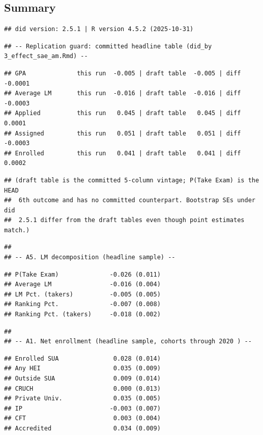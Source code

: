 \documentclass[
]{article}
\begin{document}
\hypertarget{summary}{%
\subsection{Summary}\label{summary}}

\begin{verbatim}
## did version: 2.5.1 | R version 4.5.2 (2025-10-31)
\end{verbatim}

\begin{verbatim}
## -- Replication guard: committed headline table (did_by 3_effect_sae_am.Rmd) --
\end{verbatim}

\begin{verbatim}
## GPA              this run  -0.005 | draft table  -0.005 | diff  -0.0001
## Average LM       this run  -0.016 | draft table  -0.016 | diff  -0.0003
## Applied          this run   0.045 | draft table   0.045 | diff   0.0001
## Assigned         this run   0.051 | draft table   0.051 | diff  -0.0003
## Enrolled         this run   0.041 | draft table   0.041 | diff   0.0002
\end{verbatim}

\begin{verbatim}
## (draft table is the committed 5-column vintage; P(Take Exam) is the HEAD
##  6th outcome and has no committed counterpart. Bootstrap SEs under did
##  2.5.1 differ from the draft tables even though point estimates match.)
\end{verbatim}

\begin{verbatim}
## 
## -- A5. LM decomposition (headline sample) --
\end{verbatim}

\begin{verbatim}
## P(Take Exam)              -0.026 (0.011)
## Average LM                -0.016 (0.004)
## LM Pct. (takers)          -0.005 (0.005)
## Ranking Pct.              -0.007 (0.008)
## Ranking Pct. (takers)     -0.018 (0.002)
\end{verbatim}

\begin{verbatim}
## 
## -- A1. Net enrollment (headline sample, cohorts through 2020 ) --
\end{verbatim}

\begin{verbatim}
## Enrolled SUA               0.028 (0.014)
## Any HEI                    0.035 (0.009)
## Outside SUA                0.009 (0.014)
## CRUCH                      0.000 (0.013)
## Private Univ.              0.035 (0.005)
## IP                        -0.003 (0.007)
## CFT                        0.003 (0.004)
## Accredited                 0.034 (0.009)
\end{verbatim}
\end{document}
